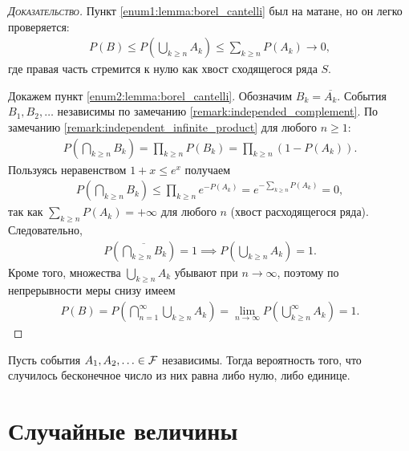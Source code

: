 \documentclass[../main.tex]{subfiles}
\begin{document}
\begin{proof}[\normalfont\textsc{Доказательство}]
 Пункт \ref{enum1:lemma:borel_cantelli} был на матане, но он легко проверяется:
 \begin{align*}
  P(B) \leqslant P \left( \bigcup_{k \geqslant n} A_k \right) \leqslant \sum_{k \geqslant n} P(A_k) \to 0,
 \end{align*} где правая часть стремится к нулю как хвост сходящегося ряда $ S $.

 Докажем пункт \ref{enum2:lemma:borel_cantelli}. Обозначим $B_k = \overline {A_k}$. События $B_1, B_2, \ldots$ независимы по замечанию \ref{remark:independed_complement}. По замечанию \ref{remark:independent_infinite_product} для любого $ n \geqslant 1$:
 \begin{align*}
  P \left( \bigcap_{k \geqslant n} B_k \right) = \prod_{k \geqslant n} P(B_k) = \prod_{k \geqslant n} (1 - P(A_k)).
 \end{align*} Пользуясь неравенством $ 1 + x \leqslant e^{x} $ получаем 
 \begin{align*}
  P \left( \bigcap_{k \geqslant n} B_k \right) \leqslant \prod_{k \geqslant n} e^{-P(A_k)} = e^{-\sum_{k \geqslant n} P(A_k)} = 0,
 \end{align*} так как $ \sum_{k \geqslant n} P(A_k) = +\infty $ для любого $ n $ (хвост расходящегося ряда). Следовательно,
 \begin{align*}
  P \left( \overline { \bigcap_{k \geqslant n} B_k } \right) = 1 \implies P \left( \bigcup_{k \geqslant n} A_k \right) = 1.
 \end{align*} Кроме того, множества $\bigcup_{k \geqslant n} A_k$ убывают при $ n \to \infty $, поэтому по непрерывности меры снизу имеем
 \begin{align*}
  P(B) = P \left( \bigcap_{n=1}^{\infty} \bigcup_{k \geqslant n} A_k \right) = \lim_{n \to \infty} P \left( \bigcup_{k \geqslant n}^{\infty} A_k \right) = 1.
 \end{align*}
\end{proof}
\begin{crly*}
 Пусть события $A_1, A_2, \ldots \in \mathcal F$ независимы. Тогда вероятность того, что случилось бесконечное число из них равна либо нулю, либо единице. 
\end{crly*}

\section{Случайные величины}
\end{document}

